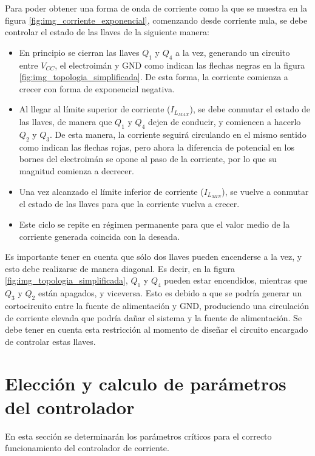 Para poder obtener una forma de onda de corriente como la que se muestra en la figura \ref{fig:img_corriente_exponencial}, comenzando desde corriente nula, se debe controlar el estado de las llaves de la siguiente manera:


\begin{itemize}
	\item En principio se cierran las llaves $Q_1$ y $Q_4$ a la vez, generando un circuito entre $V_{CC}$, el electroimán y GND como indican las flechas negras en la figura \ref{fig:img_topologia_simplificada}. De esta forma, la corriente comienza a crecer con forma de exponencial negativa.
	\item Al llegar al límite superior de corriente ($I_{L_{MAX}}$), se debe conmutar el estado de las llaves, de manera que $Q_1$ y $Q_4$ dejen de conducir, y comiencen a hacerlo $Q_2$ y $Q_3$. De esta manera, la corriente seguirá circulando en el mismo sentido como indican las flechas rojas, pero ahora la diferencia de potencial en los bornes del electroimán se opone al paso de la corriente, por lo que su magnitud comienza a decrecer.
	\item Una vez alcanzado el límite inferior de corriente ($I_{L_{MIN}}$), se vuelve a conmutar el estado de las llaves para que la corriente vuelva a crecer.
	\item Este ciclo se repite en régimen permanente para que el valor medio de la corriente generada coincida con la deseada. 
\end{itemize}

Es importante tener en cuenta que sólo dos llaves pueden encenderse a la vez, y esto debe realizarse de manera diagonal. Es decir, en la figura \ref{fig:img_topologia_simplificada}, $Q_1$ y $Q_4$ pueden estar encendidos, mientras que $Q_3$ y $Q_2$ están apagados, y viceversa. Esto es debido a que se podría generar un cortocircuito entre la fuente de alimentación y GND, produciendo una circulación de corriente elevada que podría dañar el sistema y la fuente de alimentación. Se debe tener en cuenta esta restricción al momento de diseñar el circuito encargado de controlar estas llaves.



\section{Elección y calculo de parámetros del controlador}
En esta sección se determinarán los parámetros críticos para el correcto funcionamiento del controlador de corriente.
